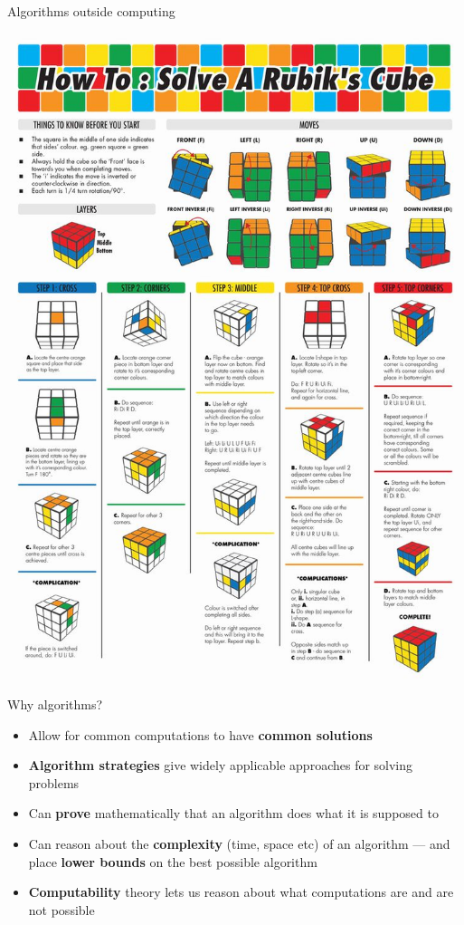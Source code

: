 \begin{frame}{Algorithms outside computing}
	\begin{center}
		\includegraphics[height=0.8\textheight]{rubik_algorithm}
	\end{center}
\end{frame}

\begin{frame}{Why algorithms?}
	\begin{itemize}
		\pause\item Allow for common computations to have \textbf{common solutions}
		\pause\item \textbf{Algorithm strategies} give widely applicable approaches for solving problems
		\pause\item Can \textbf{prove} mathematically that an algorithm does what it is supposed to
		\pause\item Can reason about the \textbf{complexity} (time, space etc) of an algorithm
		    --- and place \textbf{lower bounds} on the best possible algorithm
		\pause\item \textbf{Computability} theory lets us reason about what computations are and are not possible
	\end{itemize}
\end{frame}

